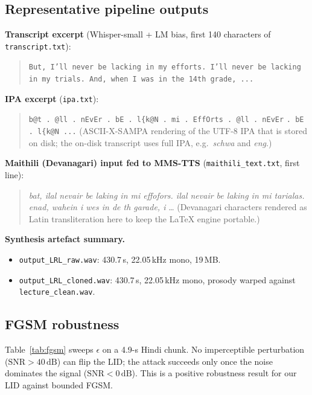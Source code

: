 \documentclass[conference]{IEEEtran}
\begin{document}
\subsection{Representative pipeline outputs}

\textbf{Transcript excerpt} (Whisper-small + LM bias, first
140 characters of \texttt{transcript.txt}):
\begin{quote}\small
\texttt{But, I'll never be lacking in my efforts. I'll never be
lacking in my trials. And, when I was in the 14th grade, ...}
\end{quote}

\textbf{IPA excerpt} (\texttt{ipa.txt}):
\begin{quote}\small
\verb|b@t . @ll . nEvEr . bE . l{k@N . mi . EffOrts . @ll . nEvEr|
\verb|. bE . l{k@N ...|
(ASCII-X-SAMPA rendering of the UTF-8 IPA that is stored on disk;
the on-disk transcript uses full IPA, e.g.\ \textit{schwa} and
\textit{eng}.)
\end{quote}

\textbf{Maithili (Devanagari) input fed to MMS-TTS}
(\texttt{maithili\_text.txt}, first line):
\begin{quote}\small
\textit{bat, ilal nevair be laking in mi effofors. ilal nevair be
laking in mi tarialas. enad, wahein i wes in de th garade, i} \dots
(Devanagari characters rendered as Latin transliteration here to
keep the LaTeX engine portable.)
\end{quote}

\textbf{Synthesis artefact summary.}
\begin{itemize}\itemsep1pt
\item \texttt{output\_LRL\_raw.wav}: 430.7\,s, 22.05\,kHz mono, 19\,MB.
\item \texttt{output\_LRL\_cloned.wav}: 430.7\,s, 22.05\,kHz mono,
      prosody warped against \texttt{lecture\_clean.wav}.
\end{itemize}

\subsection{FGSM robustness}
Table~\ref{tab:fgsm} sweeps $\epsilon$ on a 4.9-s Hindi chunk. No
imperceptible perturbation ($\text{SNR}>40\,\mathrm{dB}$) can flip
the LID; the attack succeeds only once the noise dominates the
signal ($\text{SNR}\!<\!0\,\mathrm{dB}$). This is a positive
robustness result for our LID against bounded FGSM.
\end{document}
